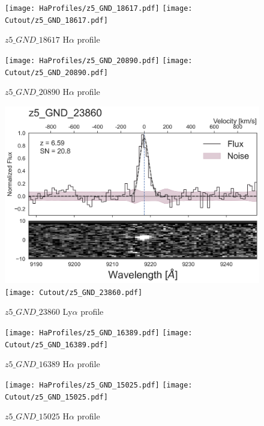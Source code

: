 \documentclass[12pt,english]{article}
\begin{document}
\clearpage
\begin{figure}
\begin{center}\texttt{[image: HaProfiles/z5\_GND\_18617.pdf]}
\texttt{[image: Cutout/z5\_GND\_18617.pdf]}
\caption{$z5\_GND\_18617$ H$\alpha$ profile}
\end{center}
\end{figure}
\clearpage
\begin{figure}
\begin{center}\texttt{[image: HaProfiles/z5\_GND\_20890.pdf]}
\texttt{[image: Cutout/z5\_GND\_20890.pdf]}
\caption{$z5\_GND\_20890$ H$\alpha$ profile}
\end{center}
\end{figure}
\clearpage
\begin{figure}
\begin{center}\includegraphics[width=12cm, trim=0.1cm 0cm 0cm -1cm]{LyaProfiles/z5_GND_23860.png}
\texttt{[image: Cutout/z5\_GND\_23860.pdf]}
\caption{$z5\_GND\_23860$ Ly$\alpha$ profile}
\end{center}
\end{figure}
\clearpage
\begin{figure}
\begin{center}\texttt{[image: HaProfiles/z5\_GND\_16389.pdf]}
\texttt{[image: Cutout/z5\_GND\_16389.pdf]}
\caption{$z5\_GND\_16389$ H$\alpha$ profile}
\end{center}
\end{figure}
\clearpage
\begin{figure}
\begin{center}\texttt{[image: HaProfiles/z5\_GND\_15025.pdf]}
\texttt{[image: Cutout/z5\_GND\_15025.pdf]}
\caption{$z5\_GND\_15025$ H$\alpha$ profile}
\end{center}
\end{figure}
\end{document}
